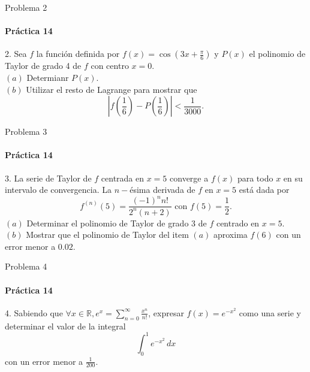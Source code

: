 \documentclass{plantillaPPt}
\begin{document}
\begin{frame}{Problema 2}
    \framesubtitle{Práctica 14}
    2. Sea $f$ la función definida por $f(x) = \cos(3x+\frac{\pi}{6})$ y $P(x)$ el polinomio de Taylor de grado 4 de $f$ con centro $x=0$.\\[10pt]
    $(a)$ Determianr $P(x)$.\\
    $(b)$ Utilizar el resto de Lagrange para mostrar que 
    \begin{equation*}
        \left|f\left(\frac{1}{6}\right)-P\left(\frac{1}{6}\right)\right|<\frac{1}{3000}.
    \end{equation*}
\end{frame}
\begin{frame}{Problema 3}
    \framesubtitle{Práctica 14}
    3. La serie de Taylor de $f$ centrada en $x=5$ converge a $f(x)$ para todo $x$ en su intervalo de convergencia. La $n-$ésima derivada de $f$ en $x=5$ está dada por
    \begin{equation*}
        f^{(n)}(5) = \frac{(-1)^nn!}{2^n(n+2)} \text{  con  }f(5)=\frac{1}{2}.
    \end{equation*}
    $(a)$ Determinar el polinomio de Taylor de grado 3 de $f$ centrado en $x=5$.\\
    $(b)$ Mostrar que el polinomio de Taylor del item $(a)$ aproxima $f(6)$ con un error menor a $0.02$.
\end{frame}
\begin{frame}{Problema 4}
    \framesubtitle{Práctica 14}
    4. Sabiendo que $\displaystyle \forall x\in\mathbb{R}, e^x=\sum_{n=0}^\infty \frac{x^n}{n!}$, expresar $f(x) = e^{-x^2}$ como una serie y determinar el valor de la integral
    \begin{equation*}
        \int_0^1 e^{-x^2}\,dx
    \end{equation*}
    con un error menor a $\frac{1}{200}$.
\end{frame}
\end{document}

